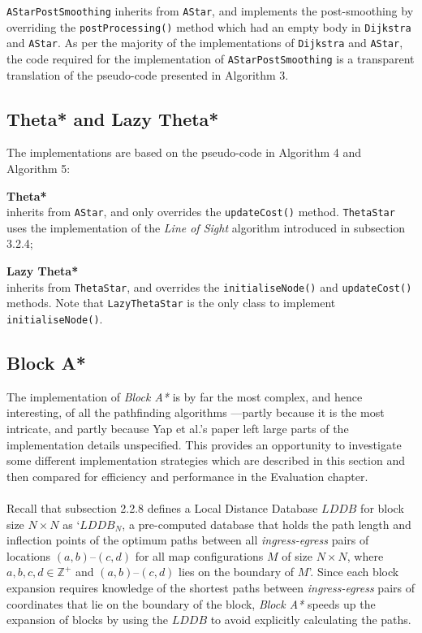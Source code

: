 \documentclass[12pt,notitlepage]{report}
\begin{document}
{\tt AStarPostSmoothing} inherits from {\tt AStar}, and implements the post-smoothing by overriding the {\tt postProcessing()} method which had an empty body in {\tt Dijkstra} and {\tt AStar}. As per the majority of the implementations of {\tt Dijkstra} and {\tt AStar}, the code required for the implementation of {\tt AStarPostSmoothing} is a transparent translation of the pseudo-code presented in Algorithm 3.\\

\subsection {Theta* and Lazy Theta*}

The implementations are based on the pseudo-code in Algorithm 4 and Algorithm 5: 
\begin{description}
\item{\bfseries Theta*}\\ \hfill inherits from {\tt AStar}, and only overrides the {\tt updateCost()} method. {\tt ThetaStar} uses the implementation of the {\em Line of Sight} algorithm introduced in subsection 3.2.4;
\item {\bfseries Lazy Theta*}\\ \hfill inherits from {\tt ThetaStar}, and overrides the {\tt initialiseNode()} and {\tt updateCost()} methods. Note that {\tt LazyThetaStar} is the only class to implement {\tt initialiseNode()}.
\end{description}

\subsection {Block A*}
The implementation of {\em Block A*} is by far the most complex, and hence interesting, of all the pathfinding algorithms ---partly because it is the most intricate, and partly because Yap et al.'s paper left large parts of the implementation details unspecified. This provides an opportunity to investigate some different implementation strategies which are described in this section and then compared for efficiency and performance in the Evaluation chapter.\\

\\
\noindent
Recall that subsection 2.2.8 defines a Local Distance Database $LDDB$ for block size $N \times N$ as `$LDDB_{N}$, a pre-computed database that holds the path length and inflection points of the optimum paths between all {\em ingress-egress} pairs of locations $(a,b)$--$(c,d)$ for all map configurations $M$ of size $N \times N$, where $a,b,c,d \in \mathbb{Z^+}$ and $(a,b)$--$(c,d)$ lies on the boundary of $M$'. Since each block expansion requires knowledge of the shortest paths between {\em ingress-egress} pairs of coordinates that lie on the boundary of the block, {\em Block A*} speeds up the expansion of blocks by using the $LDDB$ to avoid explicitly calculating the paths.\\
\end{document}
